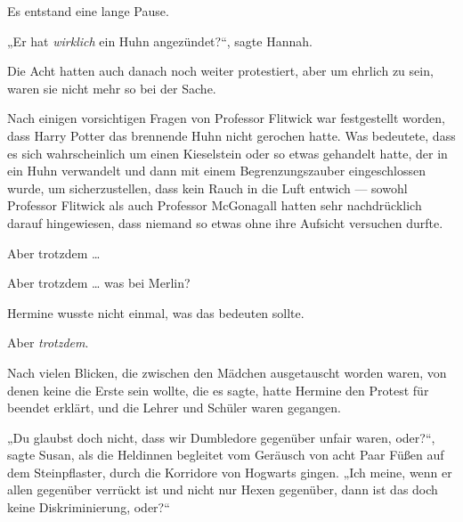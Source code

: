Es entstand eine lange Pause.

„Er hat \emph{wirklich} ein Huhn angezündet?“, sagte Hannah.

\later

Die Acht hatten auch danach noch weiter protestiert, aber um ehrlich zu sein, waren sie nicht mehr so bei der Sache.

Nach einigen vorsichtigen Fragen von Professor Flitwick war festgestellt worden, dass Harry Potter das brennende Huhn nicht gerochen hatte. Was bedeutete, dass es sich wahrscheinlich um einen Kieselstein oder so etwas gehandelt hatte, der in ein Huhn verwandelt und dann mit einem Begrenzungszauber eingeschlossen wurde, um sicherzustellen, dass kein Rauch in die Luft entwich — sowohl Professor Flitwick als auch Professor McGonagall hatten sehr nachdrücklich darauf hingewiesen, dass niemand so etwas ohne ihre Aufsicht versuchen durfte.

Aber trotzdem …

Aber trotzdem … was bei Merlin?

Hermine wusste nicht einmal, was das bedeuten sollte.

Aber \emph{trotzdem}.

Nach vielen Blicken, die zwischen den Mädchen ausgetauscht worden waren, von denen keine die Erste sein wollte, die es sagte, hatte Hermine den Protest für beendet erklärt, und die Lehrer und Schüler waren gegangen.

„Du glaubst doch nicht, dass wir Dumbledore gegenüber unfair waren, oder?“, sagte Susan, als die Heldinnen begleitet vom Geräusch von acht Paar Füßen auf dem Steinpflaster, durch die Korridore von Hogwarts gingen.
„Ich meine, wenn er allen gegenüber verrückt ist und nicht nur Hexen gegenüber, dann ist das doch keine Diskriminierung, oder?“

